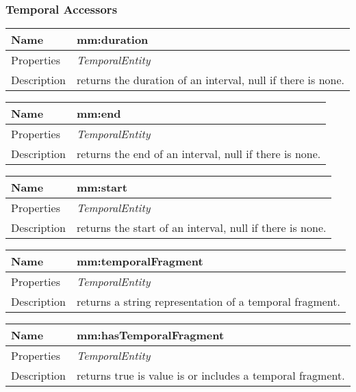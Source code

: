 \subsubsection*{Temporal Accessors}
\begin{tabular}{|p{3cm}|p{10cm}|}
\hline Name & mm:duration\\
\hline Properties & \textit{TemporalEntity} \\
\hline Description & returns the duration of an interval, null if there is none.\\
\hline
\end{tabular}
\vspace{0.3cm}
\newline
\begin{tabular}{|p{3cm}|p{10cm}|}
\hline Name & mm:end\\
\hline Properties & \textit{TemporalEntity} \\
\hline Description & returns the end of an interval, null if there is none.\\
\hline
\end{tabular}
\vspace{0.3cm}
\newline
\begin{tabular}{|p{3cm}|p{10cm}|}
\hline Name & mm:start\\
\hline Properties & \textit{TemporalEntity} \\
\hline Description & returns the start of an interval, null if there is none.\\
\hline
\end{tabular}
\vspace{0.3cm}
\newline
\begin{tabular}{|p{3cm}|p{10cm}|}
\hline Name & mm:temporalFragment\\
\hline Properties & \textit{TemporalEntity} \\
\hline Description & returns a string representation of a temporal fragment.\\
\hline
\end{tabular}
\vspace{0.3cm}
\newline
\begin{tabular}{|p{3cm}|p{10cm}|}
\hline Name & mm:hasTemporalFragment\\
\hline Properties & \textit{TemporalEntity} \\
\hline Description & returns true is value is or includes a temporal fragment.\\
\hline
\end{tabular}
\vspace{0.3cm}
\newline
